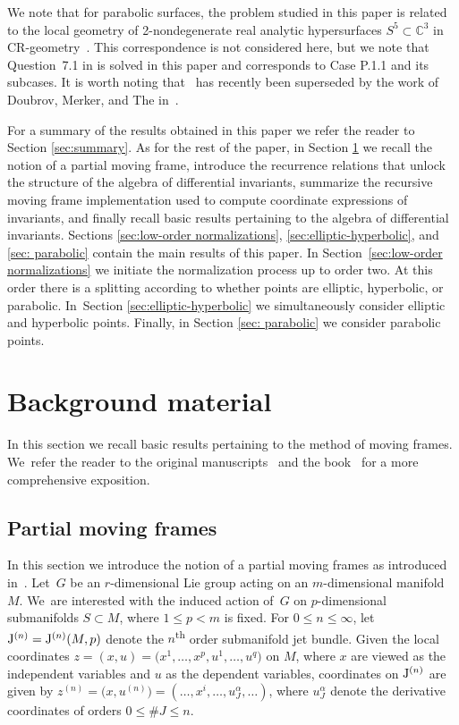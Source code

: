 \documentclass[pdftex]{sigma}%
\numberwithin{equation}{section}
\newcommand{\J}{{\rm J}}
\newcommand{\n}{^{(n)}}
\begin{document}
We note that for parabolic surfaces, the problem studied in this paper is related to the local geometry of 2-nondegenerate real analytic hypersurfaces $S^5\subset \mathbb{C}^3$ in CR-geometry~\cite{M-2019}. This correspondence is not considered here, but we note that Question~7.1 in \cite[Section~7]{M-2019} is solved in this paper and corresponds to Case P.1.1 and its subcases. It is worth noting that~\cite{M-2019} has recently been superseded by the work of Doubrov, Merker, and The in~\cite{DMT-2020}.

 For a summary of the results obtained in this paper we refer the reader to Section \ref{sec:summary}. As for the rest of the paper, in Section \ref{sec:background} we recall the notion of a partial moving frame, introduce the recurrence relations that unlock the structure of the algebra of differential invariants, summarize the recursive moving frame implementation used to compute coordinate expressions of invariants, and finally recall basic results pertaining to the algebra of differential invariants. Sections \ref{sec:low-order normalizations}, \ref{sec:elliptic-hyperbolic}, and \ref{sec: parabolic} contain the main results of this paper. In Section~\ref{sec:low-order normalizations} we initiate the normalization process up to order two. At this order there is a splitting according to whether points are elliptic, hyperbolic, or parabolic. In~Section \ref{sec:elliptic-hyperbolic} we simultaneously consider elliptic and hyperbolic points. Finally, in Section \ref{sec: parabolic} we consider parabolic points.

\section{Background material}\label{sec:background}

In this section we recall basic results pertaining to the method of moving frames. We~refer the reader to the original manuscripts~\cite{FO-1999,KO-2003,O-2011} and the book~\cite{M-2010} for a more comprehensive exposition.

\subsection{Partial moving frames}\label{sec:partial moving frames}

In this section we introduce the notion of a partial moving frames as introduced in~\cite{O-2011}. Let~$G$ be an $r$-dimensional Lie group acting on an $m$-dimensional manifold $M$. We~are interested with the induced action of~$G$ on $p$-dimensional submanifolds $S\subset M$, where $1\leq p < m$ is fixed. For $0\leq n \leq \infty$, let $\J\n = \J\n(M,p)$ denote the $n$\textsuperscript{th} order submanifold jet bundle. Given the local coordinates $z=(x,u)=\big(x^1,\dots,x^p,u^1,\dots,u^q\big)$ on $M$, where $x$ are viewed as the independent variables and $u$ as the dependent variables, coordinates on $\J\n$ are given by $z\n = \big(x,u\n\big)=(\dots, x^i, \dots, u^\alpha_J, \dots)$, where $u^\alpha_J$ denote the derivative coordinates of orders $0\leq \#J\leq n$.
\end{document}
